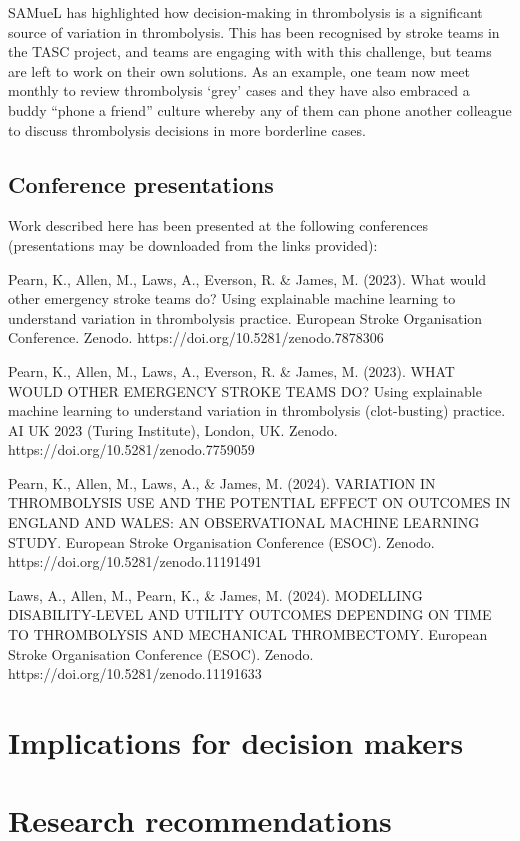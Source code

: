 SAMueL has highlighted how decision-making in thrombolysis is a significant source of variation in thrombolysis. This has been recognised by stroke teams in the TASC project, and teams are engaging with with this challenge, but teams are left to work on their own solutions. As an example, one team now meet monthly to review thrombolysis ‘grey’ cases and they have also embraced a buddy “phone a friend” culture whereby any of them can phone another colleague to discuss thrombolysis decisions in more borderline cases.

\subsection{Conference presentations}

Work described here has been presented at the following conferences (presentations may be downloaded from the links provided):

Pearn, K., Allen, M., Laws, A., Everson, R. \& James, M. (2023). What would other emergency stroke teams do? Using explainable machine learning to understand variation in thrombolysis practice. European Stroke Organisation Conference. Zenodo. https://doi.org/10.5281/zenodo.7878306

Pearn, K., Allen, M., Laws, A., Everson, R. \& James, M. (2023). WHAT WOULD OTHER EMERGENCY STROKE TEAMS DO? Using explainable machine learning to understand variation in thrombolysis (clot-busting) practice. AI UK 2023 (Turing Institute), London, UK. Zenodo. https://doi.org/10.5281/zenodo.7759059

Pearn, K., Allen, M., Laws, A., \& James, M. (2024). VARIATION IN THROMBOLYSIS USE AND THE POTENTIAL EFFECT ON OUTCOMES IN ENGLAND AND WALES: AN OBSERVATIONAL MACHINE LEARNING STUDY. European Stroke Organisation Conference (ESOC). Zenodo. https://doi.org/10.5281/zenodo.11191491

Laws, A., Allen, M., Pearn, K., \& James, M. (2024). MODELLING DISABILITY-LEVEL AND UTILITY OUTCOMES DEPENDING ON TIME TO THROMBOLYSIS AND MECHANICAL THROMBECTOMY. European Stroke Organisation Conference (ESOC). Zenodo. https://doi.org/10.5281/zenodo.11191633

\section{Implications for decision makers}

\section{Research recommendations}

